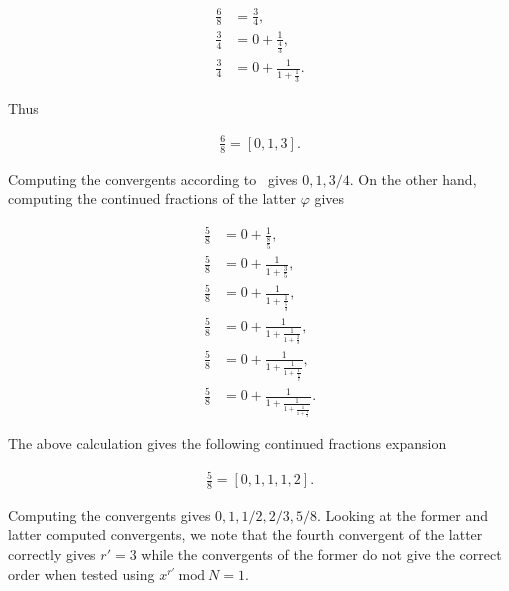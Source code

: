 \begin{align}
    \frac{6}{8} &= \frac{3}{4}, \nonumber \\
    \frac{3}{4} &= 0 + \frac{1}{\frac{4}{3}}, \nonumber \\
    \frac{3}{4} &= 0 + \frac{1}{1 + \frac{1}{3}}.
\end{align}

\noindent
Thus

\begin{align}
    \frac{6}{8} = [0, 1, 3].
\end{align}

\clearpage
\noindent
Computing the convergents according to~ gives $0, 1, 3/4$. On the other hand, computing the continued fractions of the latter $\varphi$ gives

\begin{align}
    \frac{5}{8} &= 0 + \frac{1}{\frac{8}{5}}, \nonumber \\
    \frac{5}{8} &= 0 + \frac{1}{1 + \frac{3}{5}}, \nonumber \\
    \frac{5}{8} &= 0 + \frac{1}{1 + \frac{1}{\frac{5}{3}}}, \nonumber \\
    \frac{5}{8} &= 0 + \frac{1}{1 + \frac{1}{1 + \frac{2}{3}}}, \nonumber \\
    \frac{5}{8} &= 0 + \frac{1}{1 + \frac{1}{1 + \frac{1}{\frac{3}{2}}}}, \nonumber \\
    \frac{5}{8} &= 0 + \frac{1}{1 + \frac{1}{1 + \frac{1}{1 + \frac{1}{2}}}}.
\end{align}

\noindent
The above calculation gives the following continued fractions expansion 

\begin{align}
    \frac{5}{8} = [0, 1, 1, 1, 2].
\end{align}

\noindent
Computing the convergents gives $0, 1, 1/2, 2/3, 5/8$. Looking at the former and latter computed convergents, we note that the fourth convergent of the latter correctly gives $r' = 3$ while the convergents of the former do not give the correct order when tested using $x^{r'}\>\text{mod}\>N = 1$.
